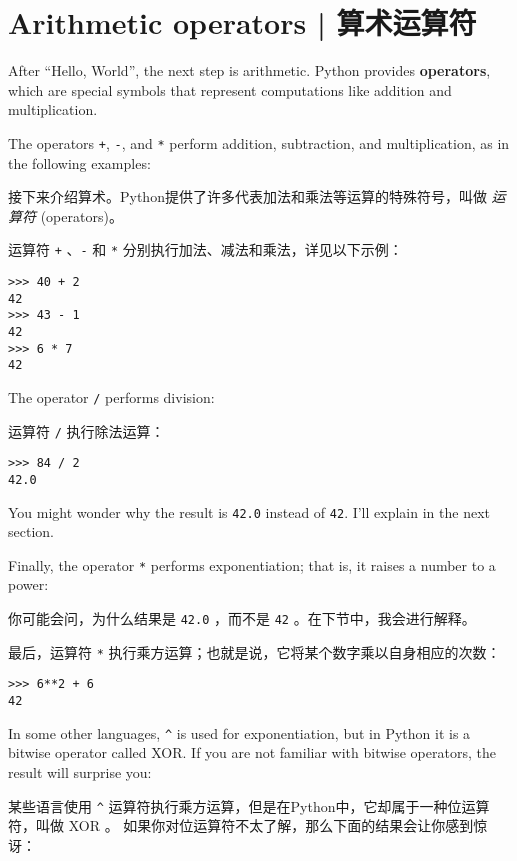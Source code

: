 \section{Arithmetic operators  |  算术运算符}
  

After ``Hello, World'', the next step is arithmetic.  Python provides
{\bf operators}, which are special symbols that represent computations
like addition and multiplication.

The operators \lstinline{+}, \lstinline{-}, and \lstinline{*} perform addition,
subtraction, and multiplication, as in the following examples:

接下来介绍算术。Python提供了许多代表加法和乘法等运算的特殊符号，叫做 \emph{运算符} (operators)。

运算符 \lstinline{+} 、\lstinline{-} 和 \lstinline{*} 分别执行加法、减法和乘法，详见以下示例：

\begin{lstlisting}
>>> 40 + 2
42
>>> 43 - 1
42
>>> 6 * 7
42
\end{lstlisting}
%
The operator \lstinline{/} performs division:

运算符 \lstinline{/} 执行除法运算：


\begin{lstlisting}
>>> 84 / 2
42.0
\end{lstlisting}
%
You might wonder why the result is {\tt 42.0} instead of {\tt 42}.
I'll explain in the next section.

Finally, the operator {\tt **} performs exponentiation; that is,
it raises a number to a power:

你可能会问，为什么结果是 \lstinline{42.0} ，而不是 \lstinline{42} 。在下节中，我会进行解释。


最后，运算符 \lstinline{*} 执行乘方运算；也就是说，它将某个数字乘以自身相应的次数：

\begin{lstlisting}
>>> 6**2 + 6
42
\end{lstlisting}
%
In some other languages, \verb"^" is used for exponentiation, but
in Python it is a bitwise operator called XOR.  If you are not
familiar with bitwise operators, the result will surprise you:

某些语言使用 \lstinline{^} 运算符执行乘方运算，但是在Python中，它却属于一种位运算符，叫做 XOR 。  如果你对位运算符不太了解，那么下面的结果会让你感到惊讶：

